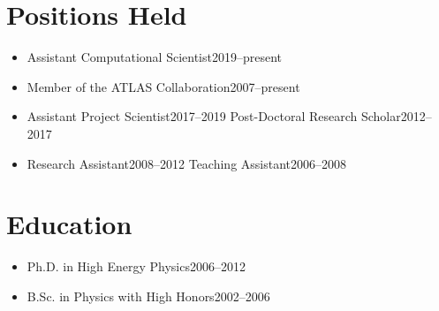 \documentclass{myfancycv}
\begin{document}
\section{Positions Held}
\begin{itemize}[leftmargin=14pt,topsep=0pt,parsep=4pt]

\item{%
%
{Assistant Computational Scientist}{2019--present}%
{}{}%
}

\item{%
%
{Member of the ATLAS Collaboration}{2007--present}%
{}{}%
}

\item{%
%
{Assistant Project Scientist}{2017--2019}%
{Post-Doctoral Research Scholar}{2012--2017}%
}

\item{%
%
{Research Assistant}{2008--2012}%
{Teaching Assistant}{2006--2008}%
}

\end{itemize}


\section{Education}

\begin{itemize}[leftmargin=14pt,topsep=0pt,parsep=4pt]

\item{%
%
{Ph.D. in High Energy Physics}{2006--2012}%
{}{}%
}

\item{%
%
{B.Sc. in Physics with High Honors}{2002--2006}%
{}{}%
}

\end{itemize}
\end{document}
